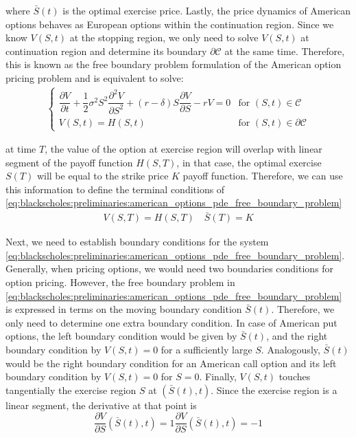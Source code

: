 where $\bar{S}(t)$ is the optimal exercise price. Lastly, the price dynamics of 
American options behaves as European options within
the continuation region. Since we know $V(S, t)$ at the stopping region, we only
need to solve $V(S,t)$ at continuation region and determine its boundary $\partial\mathcal{C}$
at the same time. Therefore, this is known as the free boundary problem formulation
of the American option pricing problem and is equivalent to solve:
\begin{align}
  \begin{cases}
  \dfrac{\partial{V}}{\partial{t}} + \dfrac{1}{2}\sigma^{2} S^2 \dfrac{\partial^2{V}}{\partial{S^2}} + (r - \delta)S \dfrac{\partial{V}}{\partial{S}} - rV = 0 & \text{for $(S, t) \in \mathcal{C}$} \\
  V(S, t) = H(S, t) & \text{for $(S,t)\in \partial\mathcal{C}$}
  \end{cases}
  \label{eq:blackscholes:preliminaries:american_options_pde_free_boundary_problem}
\end{align}

at time $T$, the value of the option at exercise region will overlap with linear
segment of the payoff function $H(S, T)$, in that case, the optimal exercise 
$S(T)$ will be equal to the strike price $K$ payoff function. Therefore, 
we can use this information to define the terminal conditions of 
\eqref{eq:blackscholes:preliminaries:american_options_pde_free_boundary_problem}
\begin{align}
  V(S,T) = H(S, T) \quad \bar{S}(T) = K
  \label{eq:blackscholes:preliminaries:american_options_terminal_condition}
\end{align}

Next, we need to establish boundary conditions for the system 
\eqref{eq:blackscholes:preliminaries:american_options_pde_free_boundary_problem}. 
Generally, when pricing options, we would need two boundaries conditions 
for option pricing. However, the free boundary problem in 
\eqref{eq:blackscholes:preliminaries:american_options_pde_free_boundary_problem}
is expressed in terms on the moving boundary condition $\bar{S}(t)$. Therefore,
we only need to determine one extra boundary condition. In case of 
American put options, the left boundary condition would be given by $\bar{S}(t)$,
and the right boundary condition by $V(S, t) = 0$ for a sufficiently large $S$. 
Analogously, $\bar{S}(t)$ would be the right boundary condition for 
an American call option and its left boundary condition by $V(S, t) = 0$ for $S = 0$. 
Finally, $V(S,t)$ touches tangentially the exercise region $S$ at $(\bar{S}(t), t)$.
Since the exercise region is a linear segment, the derivative at that point is
\begin{subequations} \label{eq:blackscholes:preliminaries:smooth_passing_condition}
  \begin{equation}
    \dfrac{\partial{V}}{\partial{S}}(\bar{S}(t), t) = 1 
  \end{equation}
  \begin{equation}
    \dfrac{\partial{V}}{\partial{S}}(\bar{S}(t), t) = -1
  \end{equation}
\end{subequations}

